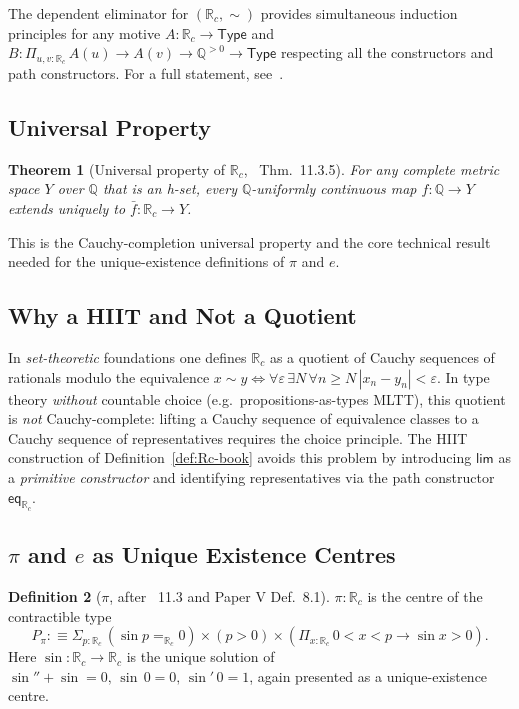 \documentclass[12pt]{article}
\newtheorem{theorem}{Theorem}[section]
\theoremstyle{definition}
\newtheorem{definition}[theorem]{Definition}
\theoremstyle{remark}
\newcommand{\Type}{\mathsf{Type}}
\newcommand{\Q}{\mathbb{Q}}
\newcommand{\Rc}{\mathbb{R}_{c}}
\newcommand{\hlim}{\mathsf{lim}}
\newcommand{\close}{\mathrel{\sim}}
\begin{document}
The dependent eliminator for $(\Rc, \close)$ provides simultaneous
induction principles for any motive $A : \Rc \to \Type$ and
$B : \Pi_{u, v : \Rc}\, A(u) \to A(v) \to \Q^{>0} \to \Type$
respecting all the constructors and path constructors. For a full
statement, see~\cite[Lemma 11.3.10]{HoTTBook}.

\subsection{Universal Property}

\begin{theorem}[Universal property of $\Rc$,~\cite{HoTTBook} Thm.~11.3.5]
\label{thm:UP-book}
For any complete metric space $Y$ over $\Q$ that is an h-set, every
$\Q$-uniformly continuous map $f : \Q \to Y$ extends uniquely to
$\bar f : \Rc \to Y$.
\end{theorem}

This is the Cauchy-completion universal property and the core technical
result needed for the unique-existence definitions of $\pi$ and $e$.

\subsection{Why a HIIT and Not a Quotient}

In \emph{set-theoretic} foundations one defines $\Rc$ as a quotient of
Cauchy sequences of rationals modulo the equivalence
$x \sim y \iff \forall \varepsilon\, \exists N\, \forall n \geq N\,
  |x_n - y_n| < \varepsilon$. In type theory \emph{without} countable
choice (e.g.\ propositions-as-types MLTT), this quotient is \emph{not}
Cauchy-complete: lifting a Cauchy sequence of equivalence classes to a
Cauchy sequence of representatives requires the choice principle. The HIIT
construction of Definition~\ref{def:Rc-book} avoids this problem by
introducing $\hlim$ as a \emph{primitive constructor} and identifying
representatives via the path constructor $\mathsf{eq}_{\Rc}$.

\subsection{\texorpdfstring{$\pi$ and $e$}{pi and e} as Unique Existence Centres}

\begin{definition}[$\pi$, after~\cite{HoTTBook} 11.3 and Paper V Def.~8.1]
\label{def:pi}
$\pi : \Rc$ is the centre of the contractible type
\[
P_{\pi} :\equiv
\Sigma_{p : \Rc}\,
 (\sin p =_{\Rc} 0) \times (p > 0) \times
 (\Pi_{x : \Rc}\, 0 < x < p \to \sin x > 0).
\]
Here $\sin : \Rc \to \Rc$ is the unique solution of
$\sin'' + \sin = 0,\, \sin\,0 = 0,\, \sin'\,0 = 1$, again presented as a
unique-existence centre.
\end{definition}
\end{document}
